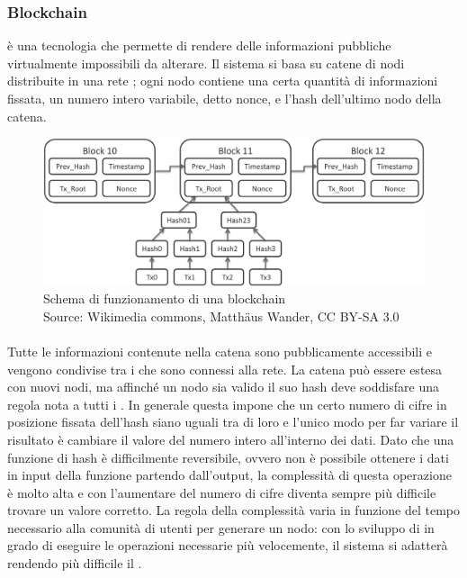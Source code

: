 	\subsubsection{Blockchain}
	 è una tecnologia che permette di rendere delle informazioni pubbliche virtualmente impossibili da alterare. Il sistema si basa su catene di nodi distribuite in una rete ; ogni nodo contiene una certa quantità di informazioni fissata, un numero intero variabile, detto nonce, e l'hash dell'ultimo nodo della catena.
	\begin{figure}[H]
		\begin{center}
			\includegraphics[width=16.5cm,keepaspectratio]{immagini/blockchain-data}
			\caption[Schema di funzionamento di una blockchain]{Schema di funzionamento di una blockchain
			\\
			Source: Wikimedia commons, Matthäus Wander, CC BY-SA 3.0}
		\end{center}
	\end{figure}
	\paragraph*{} Tutte le informazioni contenute nella catena sono pubblicamente accessibili e vengono condivise tra i  che sono connessi alla rete. La catena può essere estesa con nuovi nodi, ma affinché un nodo sia valido il suo hash deve soddisfare una regola nota a tutti i . In generale questa impone che un certo numero di cifre in posizione fissata dell'hash siano uguali tra di loro e l'unico modo per far variare il risultato è cambiare il valore del numero intero all'interno dei dati. Dato che una funzione di hash è difficilmente reversibile, ovvero non è possibile ottenere i dati in input della funzione partendo dall'output, la complessità di questa operazione è molto alta e con l'aumentare del numero di cifre diventa sempre più difficile trovare un valore corretto. La regola della complessità varia in funzione del tempo necessario alla comunità di utenti per generare un nodo: con lo sviluppo di  in grado di eseguire le operazioni necessarie più velocemente, il sistema si adatterà rendendo più difficile il .
